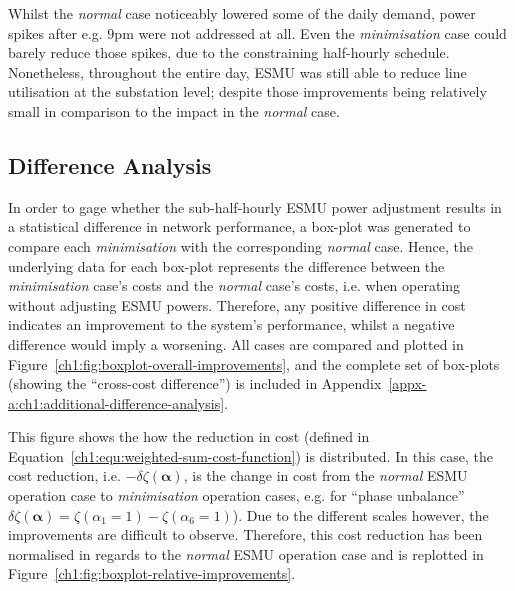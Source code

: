 

Whilst the \textit{normal} case noticeably lowered some of the daily demand, power spikes after e.g. 9pm were not addressed at all.
Even the \textit{minimisation} case could barely reduce those spikes, due to the constraining half-hourly schedule.
Nonetheless, throughout the entire day, ESMU was still able to reduce line utilisation at the substation level; despite those improvements being relatively small in comparison to the impact in the \textit{normal} case.

\subsection{Difference Analysis}
\label{ch1:subsec:difference-analysis}

In order to gage whether the sub-half-hourly ESMU power adjustment results in a statistical difference in network performance, a box-plot was generated to compare each \textit{minimisation} with the corresponding \textit{normal} case.
Hence, the underlying data for each box-plot represents the difference between the \textit{minimisation} case's costs and the \textit{normal} case's costs, i.e. when operating without adjusting ESMU powers.
Therefore, any positive difference in cost indicates an improvement to the system's performance, whilst a negative difference would imply a worsening.
All cases are compared and plotted in Figure~\ref{ch1:fig:boxplot-overall-improvements}, and the complete set of box-plots (showing the ``cross-cost difference'') is included in Appendix~\ref{appx-a:ch1:additional-difference-analysis}.



This figure shows the how the reduction in cost (defined in Equation~\ref{ch1:equ:weighted-sum-cost-function}) is distributed.
In this case, the cost reduction, i.e. $-\delta\zeta(\boldsymbol{\alpha})$, is the change in cost from the \textit{normal} ESMU operation case to \textit{minimisation} operation cases, e.g. for ``phase unbalance'' $\delta\zeta(\boldsymbol{\alpha}) = \zeta(\alpha_1 = 1) - \zeta(\alpha_6 = 1)$).
Due to the different scales however, the improvements are difficult to observe.
Therefore, this cost reduction has been normalised in regards to the \textit{normal} ESMU operation case and is replotted in Figure~\ref{ch1:fig:boxplot-relative-improvements}.



